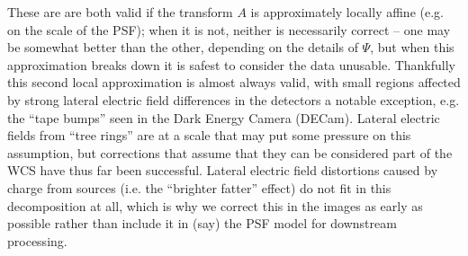 \documentclass[DM,authoryear,toc]{lsstdoc}
\begin{document}
These are are both valid if the transform $A$ is approximately locally affine (e.g. on the scale of the PSF); when it is not, neither is necessarily correct -- one may be somewhat better than the other, depending on the details of $\Psi$, but when this approximation breaks down it is safest to consider the data unusable.
Thankfully this second local approximation is almost always valid, with small regions affected by strong lateral electric field differences in the detectors a notable exception, e.g. the ``tape bumps'' seen in the Dark Energy Camera (DECam).
Lateral electric fields from ``tree rings'' are at a scale that may put some pressure on this assumption, but corrections that assume that they can be considered part of the WCS have thus far been successful.
Lateral electric field distortions caused by charge from sources (i.e. the ``brighter fatter'' effect) do not fit in this decomposition at all, which is why we correct this in the images as early as possible rather than include it in (say) the PSF model for downstream processing.
\end{document}
